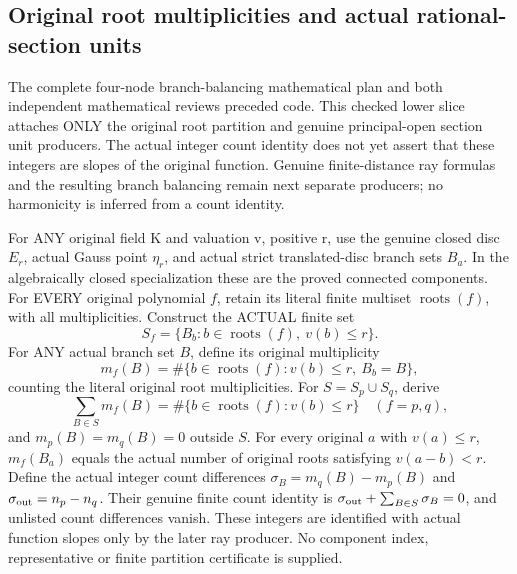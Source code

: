 \subsection{Original root multiplicities and actual rational-section units}

The complete four-node branch-balancing mathematical plan and both
independent mathematical reviews preceded code. This checked lower slice
attaches ONLY the original root partition and genuine principal-open
section unit producers. The actual integer count identity does not yet
assert that these integers are slopes of the original function. Genuine
finite-distance ray formulas and the resulting branch balancing remain
next separate producers; no harmonicity is inferred from a count identity.

\begin{lemma}
\label{analytic:actual-original-root-branch-partition}
\leanok
{}
For ANY original field K and valuation v, positive r, use the genuine closed disc $E_r$, actual
Gauss point $\eta_r$, and actual strict translated-disc branch sets $B_a$.
In the algebraically closed specialization these are the proved connected components.
For EVERY original polynomial $f$, retain its literal finite multiset
$\operatorname{roots}(f)$, with all multiplicities. Construct the ACTUAL
finite set
\[
 S_f=\{B_b:b\in\operatorname{roots}(f),\ v(b)\le r\}.
\]
For ANY actual branch set $B$, define its original multiplicity
\[
 m_f(B)=\#\{b\in\operatorname{roots}(f):v(b)\le r,\ B_b=B\},
\]
counting the literal original root multiplicities. For
$S=S_p\cup S_q$, derive
\[
 \sum_{B\in S}m_f(B)=\#\{b\in\operatorname{roots}(f):v(b)\le r\}
 \quad(f=p,q),
\]
and $m_p(B)=m_q(B)=0$ outside $S$. For every original $a$ with $v(a)\le r$,
$m_f(B_a)$ equals the actual number of original roots satisfying
$v(a-b)<r$. Define the actual integer count differences
\(\sigma_B=m_q(B)-m_p(B)\) and
\(\sigma_{\rm out}=n_p-n_q\). Their genuine finite count identity is
\(\sigma_{\rm out}+\sum_{B\in S}\sigma_B=0\), and unlisted count differences vanish.
These integers are identified with actual function slopes only by the later
ray producer. No component index, representative or finite partition certificate
is supplied.
\end{lemma}
